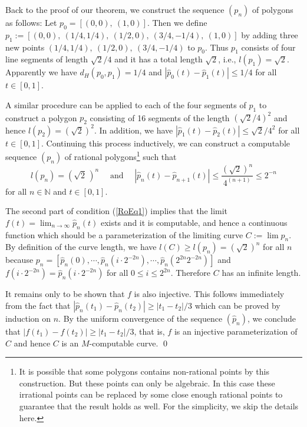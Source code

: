 \documentclass{LMCS}
\theoremstyle{plain}
\def\IN{\mathbb{N}}
\begin{document}
Back to the proof of our theorem, we construct the sequence $(p_n)$ of polygons as follows:
Let $p_0 =[(0,0),\ (1,0)]$. Then we define $p_1:=[(0,0), \ (1/4, 1/4), \ (1/2, 0), \ (3/4, -1/4), \ (1, 0)]$ by adding three new points $(1/4, 1/4), \ (1/2, 0), \ (3/4, -1/4)$ to $p_0$. Thus $p_1$ consists of four line segments of length $\sqrt{2}/4$ and it has a total length $\sqrt{2}$, i.e., $l(p_1) = \sqrt{2}$.  Apparently we have $d_H(p_0, p_1)= 1/4 $ and $|\hat{p}_0(t) -\hat{p}_1(t)| \le 1/4$ for all $t\in [0,1]$.

A similar procedure can be applied to each of the four segments of $p_1$ to construct a polygon $p_2$ consisting of 16 segments of the length $(\sqrt{2}/4)^2$ and hence $l(p_2) = (\sqrt{2})^2$. In addition, we have  $|\hat{p}_1(t)-\hat{p}_2(t)| \le {\sqrt{2}}/{4^2}$ for all $t\in [0,1]$. Continuing this process inductively, we can construct a computable sequence $(p_n)$ of rational polygons\footnote{It is possible that some polygons contains non-rational points by this construction. But these points can only be algebraic. In this case these irrational points can be replaced by some close enough rational points to guarantee that the result holds as well. For the simplicity, we skip the details here. } such that
\begin{equation} \label{RoEq1}
l(p_n) = \left(\sqrt{2}\,\right)^n \quad \mbox{ and } \quad \left|\hat{p}_n(t)- \hat{p}_{n+1}(t)\right| \le \frac{(\sqrt{2})^n}{ 4^{(n+1)}} \le 2^{-n}
\end{equation}
for all $n\in\IN$ and $t\in[0,1]$.

The second part of condition (\ref{RoEq1}) implies that the limit $f(t) =\lim_{n\to\infty} \hat{p}_n(t)$ exists and it is computable, and hence a continuous function which should be a parameterization of the limiting curve  $C := \lim p_n$. By definition of the curve length, we have $l(C) \ge l(p_n) = (\sqrt{2})^n$ for all $n$ because $p_n =[\hat{p}_n(0),\cdots, \hat{p}_n(i\cdot 2^{-2n}), \cdots, \hat{p}_n(2^{2n}2^{-2n})]$ and  $f(i\cdot 2^{-2n}) = \hat{p}_n(i\cdot 2^{-2n})$ for all $0\le i \le 2^{2n}$. Therefore $C$ has an infinite length.

It remains only to be shown that $f$ is also injective. This follows immediately from the fact that $|\hat{p}_n(t_1)-\hat{p}_n(t_2)|\geq |t_1-t_2|/3$ which can be proved by induction on $n$. By the uniform convergence of the sequence $(\hat{p}_n)$, we conclude that $|f(t_1) -f(t_2)| \ge |t_1 -t_2|/3 $, that is, $f$ is an injective parameterization of $C$ and hence $C$ is an $M$-computable curve.
\qed
\end{document}
